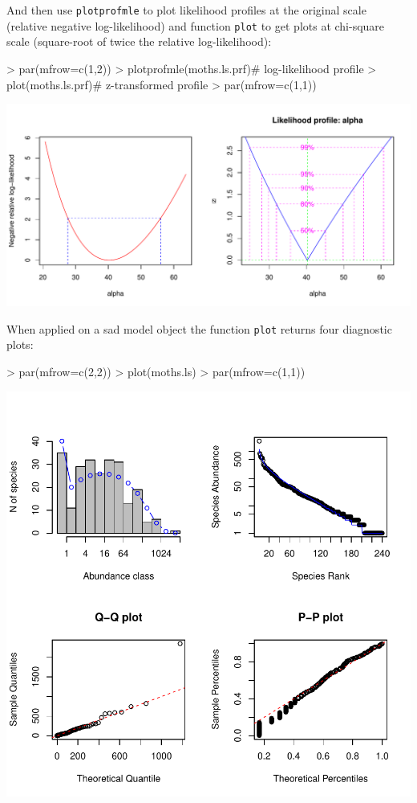\documentclass[11pt, A4]{article}
\newcommand{\code}[1]{\texttt{#1}}
\begin{document}
And then use \code{plotprofmle} to plot likelihood profiles at the original scale (relative negative log-likelihood)
and function \code{plot} to get plots at chi-square scale (square-root of twice the relative log-likelihood):


\begin{Schunk}
\begin{Sinput}
> par(mfrow=c(1,2))
> plotprofmle(moths.ls.prf)# log-likelihood profile
> plot(moths.ls.prf)# z-transformed profile
> par(mfrow=c(1,1))
\end{Sinput}
\end{Schunk}
\includegraphics{sads_quick_reference-Ploting-profiles}


When applied on a sad model object the function \code{plot} returns four diagnostic plots:
\begin{Schunk}
\begin{Sinput}
> par(mfrow=c(2,2))
> plot(moths.ls)
> par(mfrow=c(1,1))
\end{Sinput}
\end{Schunk}
\includegraphics{sads_quick_reference-Plot-of-predicted-values}
\end{document}
